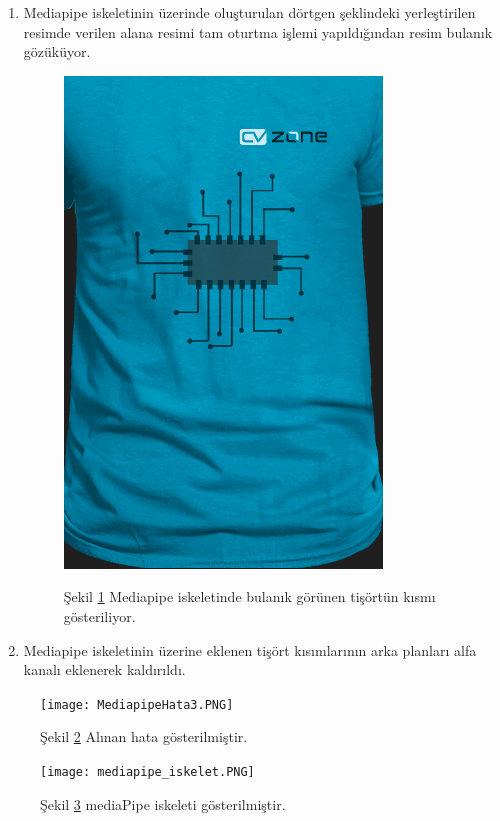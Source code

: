 \documentclass[12pt, a4paper]{article}
\begin{document}
\begin{enumerate}
\begin{figure}[!ht]
	\end{figure}
	\newpage
	\item Mediapipe iskeletinin üzerinde oluşturulan dörtgen şeklindeki yerleştirilen resimde verilen alana resimi tam oturtma işlemi yapıldığından resim bulanık gözüküyor.
	\begin{figure}[!ht]
		\caption{}
		\centering
		\includegraphics[height=0.7\textheight]{dikdortgen.PNG}
		\label{dikdortgen}
		
		
		Şekil \ref{dikdortgen} Mediapipe iskeletinde bulanık görünen tişörtün kısmı gösteriliyor\cite{MediapipeGithubb}.	
		
		
		
	\end{figure}
	\item Mediapipe iskeletinin üzerine eklenen tişört kısımlarının arka planları alfa kanalı eklenerek kaldırıldı\cite{ChatGPT3.5}.
	
\end{enumerate}
\begin{figure}[!ht]
	\caption{}
	\centering
	\texttt{[image: MediapipeHata3.PNG]}
	\label{mediapipeHata2}
	
	
	Şekil \ref{mediapipeHata2} Alınan hata gösterilmiştir.	
	
	
	
\end{figure}
\newpage
\begin{figure}[!ht]
	\caption{}
	\centering
	\texttt{[image: mediapipe\_iskelet.PNG]}
	\label{iskelet}
	
	
	Şekil \ref{iskelet} mediaPipe iskeleti gösterilmiştir\cite{MediapipeGithubb}.	
	
	
	
\end{figure}
\end{document}
